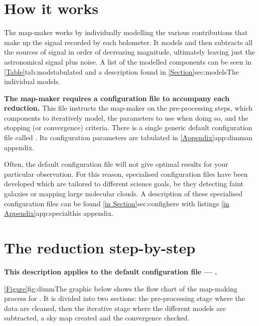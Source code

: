 \documentclass[11pt,oneside,chapters]{starlink}
\begin{document}
\section{How it works}

The map-maker works by individually modelling the various
contributions that make up the signal recorded by each bolometer. It
models and then subtracts all the sources of signal in order of
decreasing magnitude, ultimately leaving just the astronomical signal
plus noise. A list of the modelled components can be seen in
\cref{Table}{tab:mods}{tabulated} and a description found in
\cref{Section}{sec:models}{The individual models}.

\textbf{The map-maker requires a configuration file to accompany each
  reduction.} This file instructs the map-maker on the pre-processing
steps, which components to iteratively model, the parameters to use
when doing so, and the stopping (or convergence) criteria.  There is a
single generic default configuration file called
.  Its configuration parameters are tabulated in
\cref{Appendix}{app:dimm}{an appendix}.

Often, the default configuration file will not give optimal results
for your particular observation. For this reason, specialised
configuration files have been developed which are tailored to
different science goals, be they detecting faint galaxies or mapping
large molecular clouds. A description of these specialised
configuration files can be found \cref{in Section}{sec:config}{here}
with listings \cref{in Appendix}{app:special}{this appendix}.


\section{The reduction step-by-step}

\textbf{This description applies to the default configuration file ---
  .}

\cref{Figure}{fig:dimm}{The graphic below} shows the flow chart of the
map-making process for . It is divided into two
sections: the pre-processing stage where the data are cleaned, then
the iterative stage where the different models are subtracted, a sky
map created and the convergence checked.
\end{document}
